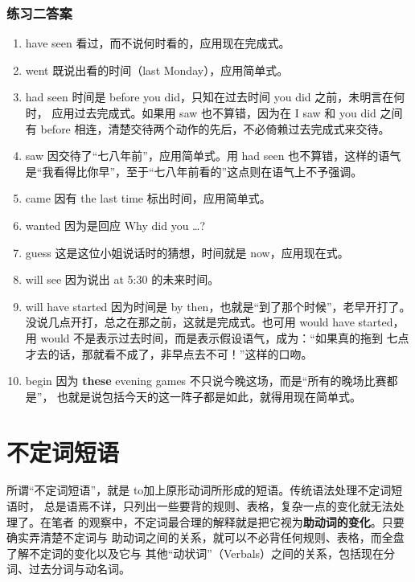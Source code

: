 \subsection{练习二答案}

\begin{enumerate}
\item have seen 看过，而不说何时看的，应用现在完成式。

\item went 既说出看的时间（last Monday），应用简单式。

\item had seen 时间是 before you did，只知在过去时间 you did 之前，未明言在何时，
  应用过去完成式。如果用 saw 也不算错，因为在 I saw 和 you did 之间有 before
  相连，清楚交待两个动作的先后，不必倚赖过去完成式来交待。

\item saw 因交待了“七八年前”，应用简单式。用 had seen 也不算错，这样的语气
  是“我看得比你早”，至于“七八年前看的”这点则在语气上不予强调。

\item came 因有 the last time 标出时间，应用简单式。

\item wanted 因为是回应 Why did you \ldots ?

\item guess 这是这位小姐说话时的猜想，时间就是 now，应用现在式。

\item will see 因为说出 at 5:30 的未来时间。

\item will have started 因为时间是 by then，也就是“到了那个时候”，老早开打了。
  没说几点开打，总之在那之前，这就是完成式。也可用 would have
  started，用 would 不是表示过去时间，而是表示假设语气，成为：“如果真的拖到
  七点才去的话，那就看不成了，非早点去不可！”这样的口吻。

\item begin 因为 \textbf{these} evening games 不只说今晚这场，而是“所有的晚场比赛都是”，
  也就是说包括今天的这一阵子都是如此，就得用现在简单式。
\end{enumerate}

\chapter{不定词短语}

所谓“不定词短语”，就是 to加上原形动词所形成的短语。传统语法处理不定词短语时，
总是语焉不详，只列出一些要背的规则、表格，复杂一点的变化就无法处理了。在笔者
的观察中，不定词最合理的解释就是把它视为\textbf{助动词的变化}。只要确实弄清楚不定词与
助动词之间的关系，就可以不必背任何规则、表格，而全盘了解不定词的变化以及它与
其他“动状词”（Verbals）之间的关系，包括现在分词、过去分词与动名词。

